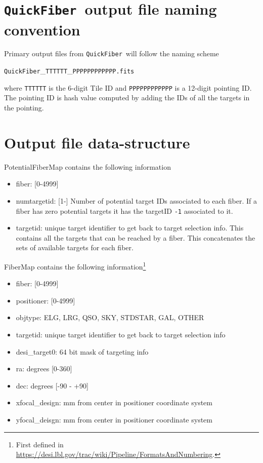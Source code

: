 \documentclass{article}
\newcommand{\code}{{\texttt{QuickFiber}}}
\begin{document}
\section{\code\ output file naming convention}

Primary output files from \code\ will follow the naming scheme

\begin{center}
\code\_{\texttt{TTTTTT}}\_{\texttt{PPPPPPPPPPPP.fits}}
\end{center}
\noindent
where \texttt{TTTTTT} is the 6-digit Tile ID and \texttt{PPPPPPPPPPPP} is
a 12-digit pointing ID. The pointing ID is hash value computed by
adding the IDs of all the targets in the pointing. 

\section{Output file data-structure}


PotentialFiberMap contains the following information
\begin{itemize}
\item fiber: [0-4999]
\item numtargetid: [1-] Number of potential target IDs associated to each
  fiber. If a fiber has zero potential targets it has the
  targetID \texttt{-1} associated to it. 
\item targetid:  unique target identifier to get back to target
      selection info. This contains  all the targets that can be
      reached by a fiber. This concatenates the sets of available
      targets for each fiber.
\end{itemize}

\noindent
FiberMap contains the following information\footnote{First defined in
  \url{https://desi.lbl.gov/trac/wiki/Pipeline/FormatsAndNumbering}.} 
\begin{itemize}
    \item fiber: [0-4999]
    \item positioner: [0-4999]
    \item objtype: ELG, LRG, QSO, SKY, STDSTAR, GAL, OTHER
    \item targetid: 
      unique target identifier to get back to target
      selection info 
    \item desi\_target0: 64 bit mask of targeting info 
    \item ra: degrees [0-360] 
    \item dec: degrees [-90 - +90] 
    \item xfocal\_design: mm from center in positioner coordinate system 
    \item yfocal\_deisgn: mm from center in positioner coordinate system  
\end{itemize}
\end{document}
